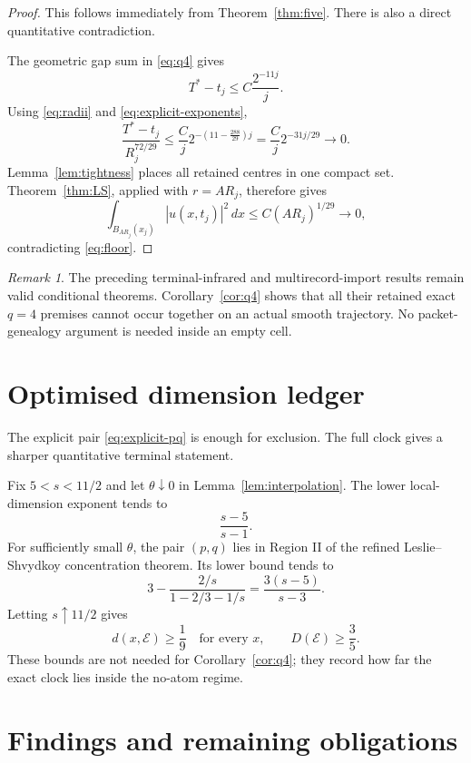 \documentclass[11pt]{article}
\theoremstyle{remark}
\newtheorem{remark}[theorem]{Remark}
\begin{document}
\begin{proof}
This follows immediately from Theorem~\ref{thm:five}.  There is also a
direct quantitative contradiction.

The geometric gap sum in \eqref{eq:q4} gives
\[
 T^*-t_j\le C\frac{2^{-11j}}j.
\]
Using \eqref{eq:radii} and \eqref{eq:explicit-exponents},
\[
 \frac{T^*-t_j}{R_j^{72/29}}
 \le
 \frac Cj
 2^{-\left(11-\frac{288}{29}\right)j}
 =
 \frac Cj2^{-31j/29}
 \longrightarrow0.
\]
Lemma~\ref{lem:tightness} places all retained centres in one compact set.
Theorem~\ref{thm:LS}, applied with \(r=AR_j\), therefore gives
\[
 \int_{B_{AR_j}(x_j)}|u(x,t_j)|^2\,dx
 \le
 C(AR_j)^{1/29}
 \longrightarrow0,
\]
contradicting \eqref{eq:floor}.
\end{proof}

\begin{remark}
The preceding terminal-infrared and multirecord-import results remain valid
conditional theorems.  Corollary~\ref{cor:q4} shows that all their retained
exact \(q=4\) premises cannot occur together on an actual smooth
trajectory.  No packet-genealogy argument is needed inside an empty cell.
\end{remark}

\section{Optimised dimension ledger}

The explicit pair \eqref{eq:explicit-pq} is enough for exclusion.  The full
clock gives a sharper quantitative terminal statement.

Fix \(5<s<11/2\) and let \(\theta\downarrow0\) in
Lemma~\ref{lem:interpolation}.  The lower local-dimension exponent tends to
\[
 \frac{s-5}{s-1}.
\]
For sufficiently small \(\theta\), the pair \((p,q)\) lies in Region II of
the refined Leslie--Shvydkoy concentration theorem.  Its lower bound tends
to
\[
 3-\frac{2/s}{1-2/3-1/s}
 =
 \frac{3(s-5)}{s-3}.
\]
Letting \(s\uparrow11/2\) gives
\begin{equation}
 \label{eq:dimensions}
 \boxed{
 d(x,\mathcal E)\ge\frac19
 \quad\text{for every }x,
 \qquad
 D(\mathcal E)\ge\frac35.
 }
\end{equation}
These bounds are not needed for Corollary~\ref{cor:q4}; they record how far
the exact clock lies inside the no-atom regime.

\section{Findings and remaining obligations}
\end{document}
